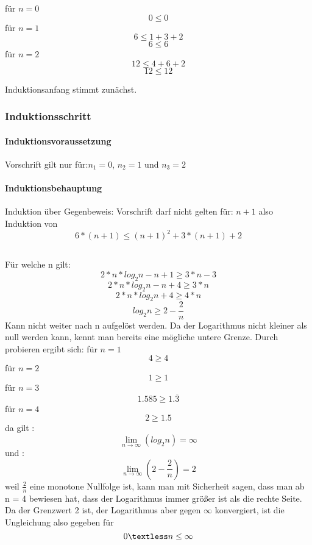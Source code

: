 \documentclass{article}
\begin{document}
für $n=0$
\[0 \le 0\]
für $n=1$
\[6 \le 1+3+2\]
\[ 6 \le 6 \]
\newline
für $n=2$
\[12 \le 4+6+2\]
\[ 12 \le 12 \]
\newline

Induktionsanfang stimmt zunächst.
\subsubsection{Induktionsschritt}
\paragraph{Induktionsvoraussetzung}\mbox{}

Vorschrift gilt nur für:$n_1=0$,  $n_2=1$ und  $n_3=2$

\paragraph{Induktionsbehauptung}\mbox{}
Induktion über Gegenbeweis:
Vorschrift darf nicht gelten für: $n+1$ also Induktion von \[6*(n+1) \le (n+1)^2+3*(n+1)+2\]
\subsection{}
Für welche n gilt:
\[2*n*log_2n-n+1 \geq 3*n-3 \]
\[2*n*log_2n-n+4 \geq 3*n \]
\[2*n*log_2n+4 \geq 4*n \]
\[log_2n \geq 2 - \frac{2}{n} \]
Kann nicht weiter nach n aufgelöst werden. Da der Logarithmus nicht kleiner als null werden kann, kennt man bereits eine
mögliche untere Grenze. Durch probieren ergibt sich:
\newline
für $n=1$ \[4 \geq 4 \]
für $n=2$ \[1 \geq 1 \]
für $n=3$ \[1.585 \geq  1.\overline{3} \]
für $n=4$ \[2 \geq  1.5 \]
da gilt :\[\lim_{n\to\infty}\left(log_2n\right)=\infty\]
und 
:\[\lim_{n\to\infty}\left(2 - \frac{2}{n}\right)=2 \] 
weil $\frac{2}{n}$ eine monotone Nullfolge ist, kann man mit Sicherheit sagen, dass man ab n = 4 bewiesen hat, dass der Logarithmus immer größer ist als die rechte Seite. Da der Grenzwert 2 ist, der Logarithmus aber gegen $\infty$ konvergiert, ist die Ungleichung also gegeben für \[ 0 \textless n \le \infty \]
\end{document}
